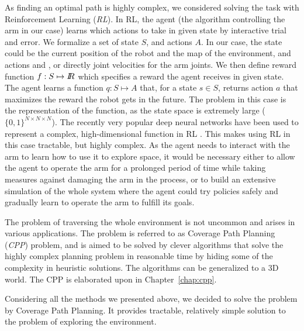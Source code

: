 \documentclass[buriama8_dp.tex]{subfiles}
\begin{document}
As finding an optimal path is highly complex, we considered solving the task with Reinforcement Learning (\emph{RL}). In RL, the agent (the algorithm controlling the arm in our case) learns which actions to take in given state by interactive trial and error. We formalize a set of state \(S\), and actions \(A\). In our case, the state could be the current position of the robot and the map of the environment, and actions  and , or directly joint velocities for the arm joints. We then define reward function \(f: S \mapsto I\!\!R\) which specifies a reward the agent receives in given state. The agent learns a function \(q: S \mapsto A\) that, for a state \(s \in S\), returns action \(a\) that maximizes the reward the robot gets in the future. The problem in this case is the representation of the function, as the state space is extremely large (\(\{0,1\}^{N \times N \times N}\)). The recently very popular deep neural networks have been used to represent a complex, high-dimensional function in RL \cite{deeprl}. This makes using RL in this case tractable, but highly complex. As the agent needs to interact with the arm to learn how to use it to explore space, it would be necessary either to allow the agent to operate the arm for a prolonged period of time while taking measures against damaging the arm in the process, or to build an extensive simulation of the whole system where the agent could try policies safely and gradually learn to operate the arm to fulfill its goals.

The problem of traversing the whole environment is not uncommon and arises in various applications. The problem is referred to as Coverage Path Planning (\emph{CPP}) problem, and is aimed to be solved by clever algorithms that solve the highly complex planning problem in reasonable time by hiding some of the complexity in heuristic solutions. The algorithms can be generalized to a 3D world. The CPP is elaborated upon in Chapter~\ref{chap:cpp}.

Considering all the methods we presented above, we decided to solve the problem by Coverage Path Planning. It provides tractable, relatively simple solution to the problem of exploring the environment.
\end{document}
